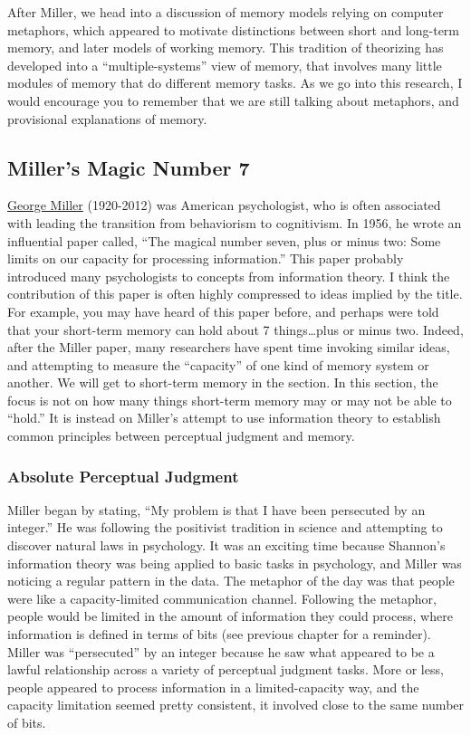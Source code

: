 \documentclass[
  oneside,
  12pt]{crumpbook}
\begin{document}
After Miller, we head into a discussion of memory models relying on computer metaphors, which appeared to motivate distinctions between short and long-term memory, and later models of working memory. This tradition of theorizing has developed into a ``multiple-systems'' view of memory, that involves many little modules of memory that do different memory tasks. As we go into this research, I would encourage you to remember that we are still talking about metaphors, and provisional explanations of memory.

\hypertarget{millers-magic-number-7}{%
\subsection{Miller's Magic Number 7}\label{millers-magic-number-7}}

\href{https://en.wikipedia.org/wiki/George_Armitage_Miller}{George Miller} (1920-2012) was American psychologist, who is often associated with leading the transition from behaviorism to cognitivism. In 1956, he wrote an influential paper called, ``The magical number seven, plus or minus two: Some limits on our capacity for processing information.'' This paper probably introduced many psychologists to concepts from information theory. I think the contribution of this paper is often highly compressed to ideas implied by the title. For example, you may have heard of this paper before, and perhaps were told that your short-term memory can hold about 7 things\ldots plus or minus two. Indeed, after the Miller paper, many researchers have spent time invoking similar ideas, and attempting to measure the ``capacity'' of one kind of memory system or another. We will get to short-term memory in the section. In this section, the focus is not on how many things short-term memory may or may not be able to ``hold.'' It is instead on Miller's attempt to use information theory to establish common principles between perceptual judgment and memory.

\hypertarget{absolute-perceptual-judgment}{%
\subsubsection{Absolute Perceptual Judgment}\label{absolute-perceptual-judgment}}

Miller began by stating, ``My problem is that I have been persecuted by an integer.'' He was following the positivist tradition in science and attempting to discover natural laws in psychology. It was an exciting time because Shannon's information theory was being applied to basic tasks in psychology, and Miller was noticing a regular pattern in the data. The metaphor of the day was that people were like a capacity-limited communication channel. Following the metaphor, people would be limited in the amount of information they could process, where information is defined in terms of bits (see previous chapter for a reminder). Miller was ``persecuted'' by an integer because he saw what appeared to be a lawful relationship across a variety of perceptual judgment tasks. More or less, people appeared to process information in a limited-capacity way, and the capacity limitation seemed pretty consistent, it involved close to the same number of bits.
\end{document}

